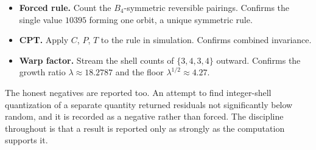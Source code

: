 \begin{itemize}
  \item \textbf{Forced rule.} Count the $B_4$-symmetric reversible pairings. Confirms the single value $10395$ forming
  one orbit, a unique symmetric rule.
  \item \textbf{CPT.} Apply $C$, $P$, $T$ to the rule in simulation. Confirms combined invariance.
  \item \textbf{Warp factor.} Stream the shell counts of $\{3,4,3,4\}$ outward. Confirms the growth ratio
  $\lambda \approx 18.2787$ and the floor $\lambda^{1/2} \approx 4.27$.
\end{itemize}

The honest negatives are reported too. An attempt to find integer-shell quantization of a separate quantity returned
residuals not significantly below random, and it is recorded as a negative rather than forced. The discipline
throughout is that a result is reported only as strongly as the computation supports it.
